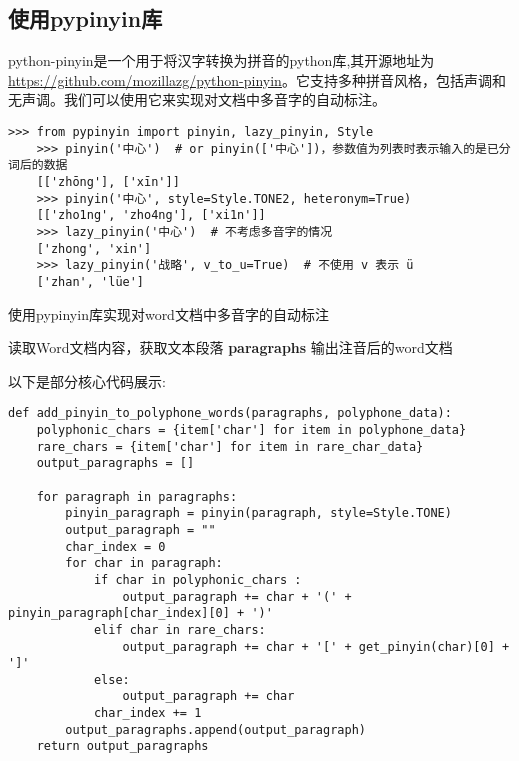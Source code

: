 \documentclass[12pt,hyperref,a4paper,UTF8]{ctexart}
\begin{document}
\subsection{使用pypinyin库}
python-pinyin是一个用于将汉字转换为拼音的python库,其开源地址为\url{https://github.com/mozillazg/python-pinyin}。它支持多种拼音风格，包括声调和无声调。我们可以使用它来实现对文档中多音字的自动标注。
\begin{lstlisting}[caption={python-pinyin的使用示例}, label={lst:example}]
    >>> from pypinyin import pinyin, lazy_pinyin, Style
    >>> pinyin('中心')  # or pinyin(['中心'])，参数值为列表时表示输入的是已分词后的数据
    [['zhōng'], ['xīn']]
    >>> pinyin('中心', style=Style.TONE2, heteronym=True)
    [['zho1ng', 'zho4ng'], ['xi1n']]
    >>> lazy_pinyin('中心')  # 不考虑多音字的情况
    ['zhong', 'xin']
    >>> lazy_pinyin('战略', v_to_u=True)  # 不使用 v 表示 ü
    ['zhan', 'lüe']
\end{lstlisting}
\begin{algorithm}[H]
    \caption{使用pypinyin库实现对word文档中多音字的自动标注}
    
    
    
    \BlankLine
    读取Word文档内容，获取文本段落 \textbf{paragraphs}\;
    输出注音后的word文档\;
\end{algorithm}
\vspace{\baselineskip}
以下是部分核心代码展示:
\begin{lstlisting}[caption={pypinyin自动注音的部分核心代码展示}, label={lst:example}]
    def add_pinyin_to_polyphone_words(paragraphs, polyphone_data):
    polyphonic_chars = {item['char'] for item in polyphone_data}
    rare_chars = {item['char'] for item in rare_char_data}
    output_paragraphs = []

    for paragraph in paragraphs:
        pinyin_paragraph = pinyin(paragraph, style=Style.TONE)
        output_paragraph = ""
        char_index = 0
        for char in paragraph:
            if char in polyphonic_chars :
                output_paragraph += char + '(' + pinyin_paragraph[char_index][0] + ')'
            elif char in rare_chars:
                output_paragraph += char + '[' + get_pinyin(char)[0] + ']'
            else:
                output_paragraph += char
            char_index += 1
        output_paragraphs.append(output_paragraph)
    return output_paragraphs
\end{lstlisting}
\end{document}

